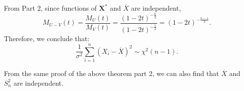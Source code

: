 \documentclass{huhtakm-template-book-v2}
\begin{document}
\begin{proofing}
\begin{enumerate}
            From Part 2, since functions of $\mathbf{X}^{*}$ and $\overline{X}$ are independent, 
            \begin{equation*}
                M_{U-V}(t) = \frac{M_{U}(t)}{M_{V}(t)} = \frac{(1 - 2t)^{-\frac{n}{2}}}{(1 - 2t)^{-\frac{1}{2}}} = (1 - 2t)^{-\frac{n - 1}{2}}.
            \end{equation*}
            Therefore, we conclude that:
            \begin{equation*}
                \frac{1}{\sigma^{2}} \sum_{i=1}^{n} (X_{i} - \overline{X})^{2} \sim \chi^{2}(n - 1).
            \end{equation*}
        \end{enumerate}
    \end{proofing}
    \begin{rem}
        From the same proof of the above theorem part 2, we can also find that $\overline{X}$ and $S_{n}^{2}$ are independent.
    \end{rem}
	\newpage
	
\end{document}
